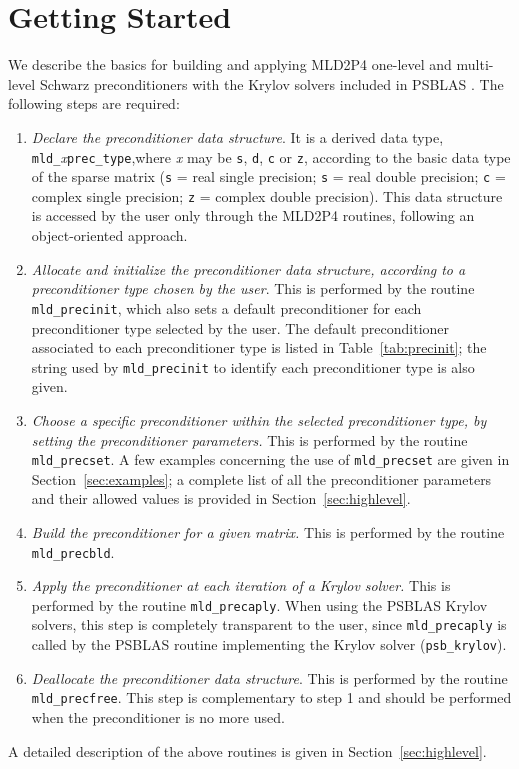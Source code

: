 \section{Getting Started\label{sec:started}}

We describe the basics for building and applying MLD2P4 one-level and multi-level
Schwarz preconditioners with the Krylov solvers included in PSBLAS \cite{}.
The following steps are required:
\begin{enumerate} 
\item \emph{Declare the preconditioner data structure}. It is a derived data type,
  \verb|mld_|\emph{x}\verb|prec_type|,where \emph{x} may be \verb|s|, \verb|d|, \verb|c|
	or \verb|z|, according to the basic data type of the sparse matrix
	(\verb|s| = real single precision; \verb|s| = real double precision;
	\verb|c| = complex single precision; \verb|z| = complex double precision).
	This data structure is accessed by the user only through the MLD2P4 routines,
	following an object-oriented approach.
\item \emph{Allocate and initialize the preconditioner data structure, according to
	a preconditioner type chosen by the user}. This is performed by the routine
	\verb|mld_precinit|, which also sets a default preconditioner for each preconditioner
	type selected by the user. The default preconditioner associated to each preconditioner
	type is listed in Table~\ref{tab:precinit}; the string used by \verb|mld_precinit|
	to identify each preconditioner type is also given.
\item \emph{Choose a specific preconditioner within the selected preconditioner type, by setting
  the preconditioner parameters.} This is performed by the routine \verb|mld_precset|.
  A few examples concerning the use of \verb|mld_precset| are given in 
  Section~\ref{sec:examples}; a complete list of all the
  preconditioner parameters and their allowed values is provided in 
  Section~\ref{sec:highlevel}. 
\item \emph{Build the preconditioner for a given matrix.} This is performed by
  the routine \verb|mld_precbld|.
\item \emph{Apply the preconditioner at each iteration of a Krylov solver.}
  This is performed by the routine \verb|mld_precaply|. When using the PSBLAS Krylov solvers,
  this step is completely transparent to the user, since \verb|mld_precaply| is called
  by the PSBLAS routine implementing the Krylov solver (\verb|psb_krylov|).
\item \emph{Deallocate the preconditioner data structure}. This is performed by
  the routine \verb|mld_precfree|. This step is complementary to step 1 and should
  be performed when the preconditioner is no more used.
\end{enumerate}
A detailed description of the above routines is given in Section~\ref{sec:highlevel}.

